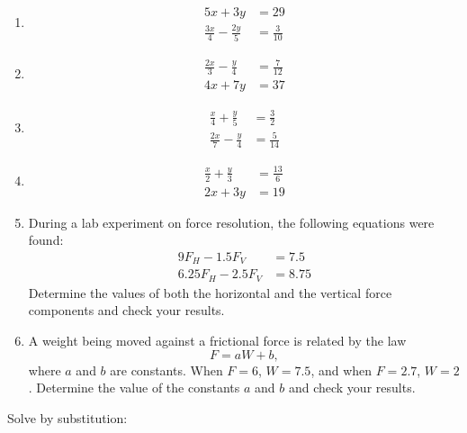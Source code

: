 \documentclass[
  english,
  12pt,
  oneside]{book}
\theoremstyle{definition}
\theoremstyle{definition}
\theoremstyle{definition}
\theoremstyle{definition}
\theoremstyle{remark}
\begin{document}
\begin{enumerate}
\def\labelenumi{\arabic{enumi}.}
\setcounter{enumi}{2}
\item
  \begin{align*}
  5x+3y &= 29\\
  \frac{3x}{4}-\frac{2y}{5} &= \frac{3}{10}
  \end{align*}
\item
  \begin{align*}
  \frac{2x}{3}-\frac{y}{4} &= \frac{7}{12}\\
  4x+7y &= 37
  \end{align*}
\item
  \begin{align*}
  \frac{x}{4}+\frac{y}{5} &= \frac{3}{2}\\
  \frac{2x}{7}-\frac{y}{4} &= \frac{5}{14}
  \end{align*}
\item
  \begin{align*}
  \frac{x}{2}+\frac{y}{3} &= \frac{13}{6}\\
  2x+3y &= 19
  \end{align*}
\item
  During a lab experiment on force resolution, the following equations were found:
  \begin{align*}
  9F_H - 1.5F_V &= 7.5\\
  6.25 F_H - 2.5 F_V &= 8.75
  \end{align*}
  Determine the values of both the horizontal and the vertical force components and check your results.
\item
  A weight being moved against a frictional force is related by the law
  \[F=aW+b,\]
  where \(a\) and \(b\) are constants. When \(F=6\), \(W=7.5\), and when
  \(F=2.7\), \(W=2\). Determine the value of the constants \(a\) and \(b\) and check
  your results.
\end{enumerate}

Solve by substitution:
\end{document}
